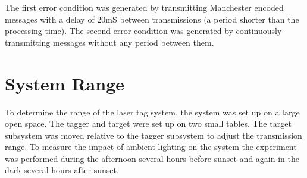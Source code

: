 The first error condition was generated by transmitting Manchester encoded messages with a delay of 20mS between transmissions (a period shorter than the processing time). The second error condition was generated by continuously transmitting messages without any period between them.








\section{System Range}

To determine the range of the laser tag system, the system was set up on a large open space. The tagger and target were set up on two small tables. The target subsystem was moved relative to the tagger subsystem to adjust the transmission range. To measure the impact of ambient lighting on the system the experiment was performed during the afternoon several hours before sunset and again in the dark several hours after sunset.

